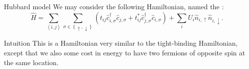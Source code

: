 \documentclass[a4paper]{article}
\begin{document}
\begin{parag}{Hubbard model}
    We may consider the following Hamiltonian, named the : 
    \[\hat{H} = \sum_{\left\langle i, j \right\rangle} \sum_{\sigma \in \left\{\uparrow, \downarrow\right\}} \left(t_{ij} \hat{c}^{\dagger}_{i, \sigma} \hat{c}_{j, \sigma} + t_{ij}^* \hat{c}_{j, \sigma}^{\dagger} \hat{c}_{i, \sigma}\right) + \sum_{i} U_i \hat{n}_{i, \uparrow} \hat{n}_{i, \downarrow}.\]

    \begin{subparag}{Intuition}
        This is a Hamiltonian very similar to the tight-binding Hamiltonian, except that we also some cost in energy to have two fermions of opposite spin at the same location.
    \end{subparag}
\end{parag}
\end{document}

